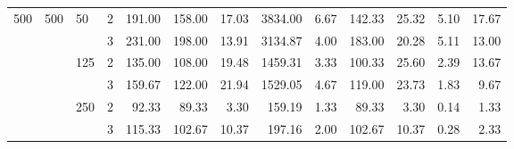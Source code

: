 \begin{tabular}{llllrrrrrrrrr}
\cline{3-13}
\multirow{6}{*}{500} & \multirow{6}{*}{500} & \multirow{2}{*}{50} & 2 & 191.00 & 158.00 &       17.03 & 3834.00 &  6.67 & 142.33 &       25.32 & 5.10 & 17.67 \\
    &     &     & 3 & 231.00 & 198.00 &       13.91 & 3134.87 &  4.00 & 183.00 &       20.28 & 5.11 & 13.00 \\
\cline{3-13}
    &     & \multirow{2}{*}{125} & 2 & 135.00 & 108.00 &       19.48 & 1459.31 &  3.33 & 100.33 &       25.60 & 2.39 & 13.67 \\
    &     &     & 3 & 159.67 & 122.00 &       21.94 & 1529.05 &  4.67 & 119.00 &       23.73 & 1.83 &  9.67 \\
\cline{3-13}
    &     & \multirow{2}{*}{250} & 2 &  92.33 &  89.33 &        3.30 &  159.19 &  1.33 &  89.33 &        3.30 & 0.14 &  1.33 \\
    &     &     & 3 & 115.33 & 102.67 &       10.37 &  197.16 &  2.00 & 102.67 &       10.37 & 0.28 &  2.33 \\
\bottomrule
\end{tabular}
